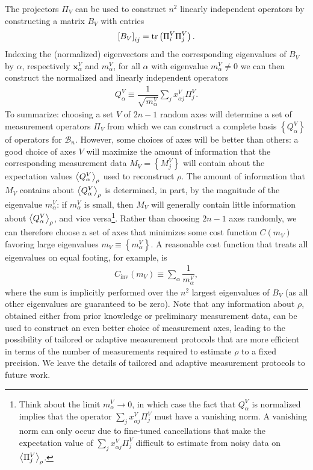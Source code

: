 \documentclass[nofootinbib,notitlepage,twocolumn]{revtex4-2}
\renewcommand{\t}{\text} %
\newcommand{\f}[2]{\dfrac{#1}{#2}} %
\newcommand{\p}[1]{\left(#1\right)} %
\renewcommand{\sp}[1]{\left[#1\right]} %
\renewcommand{\set}[1]{\left\{#1\right\}} %
\newcommand{\bk}{\Braket} %
\renewcommand{\v}{\bm} %
\newcommand{\1}{\mathds{1}}
\newcommand{\B}{\mathcal{B}}
\begin{document}
The projectors $\Pi_V$ can be used to construct $n^2$ linearly independent operators by constructing a matrix $B_V$ with entries
\begin{align}
  \sp{B_V}_{ij} = \tr\p{\Pi^V_i \Pi^V_j}.
\end{align}
Indexing the (normalized) eigenvectors and the corresponding eigenvalues of $B_V$ by $\alpha$, respectively $\v x^V_\alpha$ and $m^V_\alpha$, for all $\alpha$ with eigenvalue $m^V_\alpha\ne0$ we can then construct the normalized and linearly independent operators
\begin{align}
  Q^V_\alpha \equiv \f1{\sqrt{m^V_\alpha}} \sum_j x^V_{\alpha j} \Pi^V_j.
\end{align}
To summarize: choosing a set $V$ of $2n-1$ random axes will determine a set of measurement operators $\Pi_V$ from which we can construct a complete basis $\set{Q^V_\alpha}$ of operators for $\B_n$.
However, some choices of axes will be better than others: a good choice of axes $V$ will maximize the amount of information that the corresponding measurement data $M_V=\set{M^V_j}$ will contain about the expectation values $\bk{Q^V_\alpha}_\rho$ used to reconstruct $\rho$.
The amount of information that $M_V$ contains about $\bk{Q^V_\alpha}_\rho$ is determined, in part, by the magnitude of the eigenvalue $m^V_\alpha$: if $m^V_\alpha$ is small, then $M_V$ will generally contain little information about $\bk{Q^V_\alpha}_\rho$, and vice versa\footnote{Think about the limit $m^V_\alpha\to0$, in which case the fact that $Q^V_\alpha$ is normalized implies that the operator $\sum_j x^V_{\alpha j} \Pi^V_j$ must have a vanishing norm.
  A vanishing norm can only occur due to fine-tuned cancellations that make the expectation value of $\sum_j x^V_{\alpha j} \Pi^V_j$ difficult to estimate from noisy data on $\bk{\Pi^V_j}_\rho$.}.
Rather than choosing $2n-1$ axes randomly, we can therefore choose a set of axes that minimizes some cost function $C\p{m_V}$ favoring large eigenvalues $m_V\equiv\set{m^V_\alpha}$.
A reasonable cost function that treats all eigenvalues on equal footing, for example, is
\begin{align}
  C_{\t{inv}}\p{m_V} \equiv \sum_\alpha \f1{m^V_\alpha},
\end{align}
where the sum is implicitly performed over the $n^2$ largest eigenvalues of $B_V$ (as all other eigenvalues are guaranteed to be zero).
Note that any information about $\rho$, obtained either from prior knowledge or preliminary measurement data, can be used to construct an even better choice of measurement axes, leading to the possibility of tailored or adaptive measurement protocols \cite{pereira2018adaptive} that are more efficient in terms of the number of measurements required to estimate $\rho$ to a fixed precision.
We leave the details of tailored and adaptive measurement protocols to future work.
\end{document}
